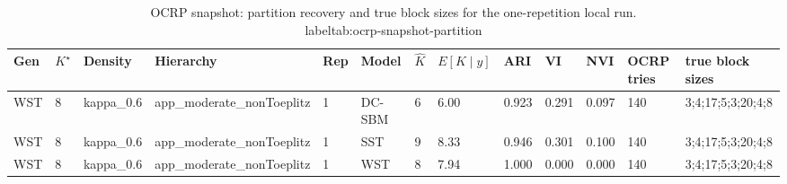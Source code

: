 \begin{table}[!h]
\centering
\caption{OCRP snapshot: partition recovery and true block sizes for the one-repetition local run.\\label{tab:ocrp-snapshot-partition}}
\centering
\begin{tabular}[t]{lllllllllllll}
\toprule
Gen & $K^\star$ & Density & Hierarchy & Rep & Model & $\hat K$ & $E[K\mid y]$ & ARI & VI & NVI & OCRP tries & true block sizes\\
\midrule
WST & 8 & kappa_0.6 & app_moderate_nonToeplitz & 1 & DC-SBM & 6 & 6.00 & 0.923 & 0.291 & 0.097 & 140 & 3;4;17;5;3;20;4;8\\
WST & 8 & kappa_0.6 & app_moderate_nonToeplitz & 1 & SST & 9 & 8.33 & 0.946 & 0.301 & 0.100 & 140 & 3;4;17;5;3;20;4;8\\
WST & 8 & kappa_0.6 & app_moderate_nonToeplitz & 1 & WST & 8 & 7.94 & 1.000 & 0.000 & 0.000 & 140 & 3;4;17;5;3;20;4;8\\
\bottomrule
\end{tabular}
\end{table}
